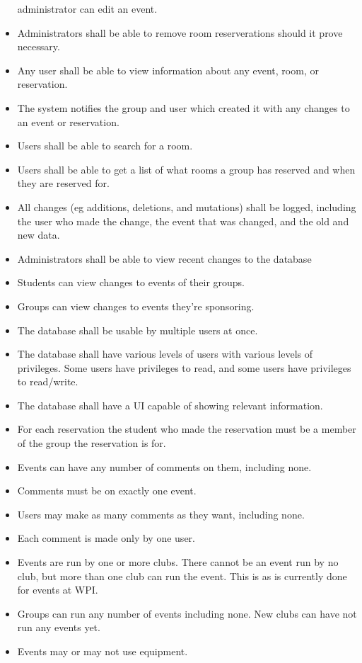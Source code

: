 \documentclass{article}
\begin{document}
\begin{itemize}
administrator can edit an event.
\item Administrators shall be able to remove room reserverations
should it prove necessary.
\item Any user shall be able to view information about any event,
room, or reservation.
\item The system notifies the group and user which created it with any
changes to an event or reservation.
\item Users shall be able to search for a room.
\item Users shall be able to get a list of what rooms a group has
reserved and when they are reserved for.
\item All changes (eg additions, deletions, and mutations) shall be
logged, including the user who made the change, the event that was
changed, and the old and new data.
\item Administrators shall be able to view recent changes to the database
\item Students can view changes to events of their groups.
\item Groups can view changes to events they're sponsoring.
\item The database shall be usable by multiple users at once.
\item The database shall have various levels of users with various
levels of privileges. Some users have privileges to read, and some
users have privileges to read/write.
\item The database shall have a UI capable of showing relevant information.
\item For each reservation the student who made the reservation must
be a member of the group the reservation is for.
\item Events can have any number of comments on them, including none.
\item Comments must be on exactly one event.
\item Users may make as many comments as they want, including none.
\item Each comment is made only by one user.
\item Events are run by one or more clubs. There cannot be an event run by no
club, but more than one club can run the event. This is as is currently done for
events at WPI.  
\item Groups can run any number of events including none. New clubs can have not
run any events yet. 
\item Events may or may not use equipment.

\end{itemize}
\end{document}
